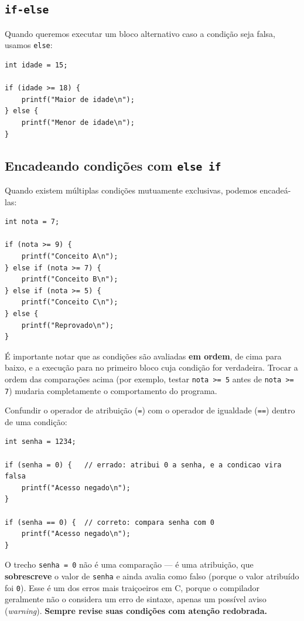 \documentclass[12pt,a4paper,oneside]{extreport}
\begin{document}
\subsection{\texttt{if-else}}

Quando queremos executar um bloco alternativo caso a condição seja falsa, usamos \texttt{else}:

\begin{lstlisting}
int idade = 15;

if (idade >= 18) {
    printf("Maior de idade\n");
} else {
    printf("Menor de idade\n");
}
\end{lstlisting}

\subsection{Encadeando condições com \texttt{else if}}

Quando existem múltiplas condições mutuamente exclusivas, podemos encadeá-las:

\begin{lstlisting}
int nota = 7;

if (nota >= 9) {
    printf("Conceito A\n");
} else if (nota >= 7) {
    printf("Conceito B\n");
} else if (nota >= 5) {
    printf("Conceito C\n");
} else {
    printf("Reprovado\n");
}
\end{lstlisting}

É importante notar que as condições são avaliadas \textbf{em ordem}, de cima para baixo, e a execução para no primeiro bloco cuja condição for verdadeira. Trocar a ordem das comparações acima (por exemplo, testar \texttt{nota >= 5} antes de \texttt{nota >= 7}) mudaria completamente o comportamento do programa.

\begin{errocomum}
Confundir o operador de atribuição (\texttt{=}) com o operador de igualdade (\texttt{==}) dentro de uma condição:
\begin{lstlisting}
int senha = 1234;

if (senha = 0) {   // errado: atribui 0 a senha, e a condicao vira falsa
    printf("Acesso negado\n");
}

if (senha == 0) {  // correto: compara senha com 0
    printf("Acesso negado\n");
}
\end{lstlisting}
O trecho \texttt{senha = 0} não é uma comparação — é uma atribuição, que \textbf{sobrescreve} o valor de \texttt{senha} e ainda avalia como falso (porque o valor atribuído foi \texttt{0}). Esse é um dos erros mais traiçoeiros em C, porque o compilador geralmente não o considera um erro de sintaxe, apenas um possível aviso (\textit{warning}). \textbf{Sempre revise suas condições com atenção redobrada.}
\end{errocomum}
\end{document}
